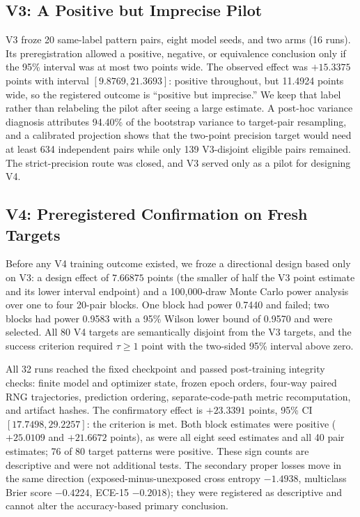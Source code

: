 \subsection{V3: A Positive but Imprecise Pilot}

V3 froze 20 same-label pattern pairs, eight model seeds, and two arms (16
runs).  Its preregistration allowed a positive, negative, or equivalence
conclusion only if the 95\% interval was at most two points wide.  The
observed effect was $+15.3375$ points with interval $[9.8769,21.3693]$:
positive throughout, but 11.4924 points wide, so the registered outcome is
``positive but imprecise.''  We keep that label rather than relabeling the
pilot after seeing a large estimate.  A post-hoc variance diagnosis
attributes 94.40\% of the bootstrap variance to target-pair resampling, and
a calibrated projection shows that the two-point precision target would
need at least 634 independent pairs while only 139 V3-disjoint eligible
pairs remained.  The strict-precision route was closed, and V3 served only
as a pilot for designing V4.

\subsection{V4: Preregistered Confirmation on Fresh Targets}

Before any V4 training outcome existed, we froze a directional design based
only on V3: a design effect of $7.66875$ points (the smaller of half the V3
point estimate and its lower interval endpoint) and a 100,000-draw Monte
Carlo power analysis over one to four 20-pair blocks.  One block had power
0.7440 and failed; two blocks had power 0.9583 with a 95\% Wilson lower
bound of 0.9570 and were selected.  All 80 V4 targets are semantically
disjoint from the V3 targets, and the success criterion required
$\tau\geq1$ point with the two-sided 95\% interval above zero.

All 32 runs reached the fixed checkpoint and passed post-training integrity
checks: finite model and optimizer state, frozen epoch orders, four-way
paired RNG trajectories, prediction ordering, separate-code-path metric
recomputation, and artifact hashes.  The confirmatory effect is $+23.3391$
points, 95\% CI $[17.7498,29.2257]$: the criterion is met.  Both block
estimates were positive ($+25.0109$ and $+21.6672$ points), as were all
eight seed estimates and all 40 pair estimates; 76 of 80 target patterns
were positive.  These sign counts are descriptive and were not additional
tests.  The secondary proper losses move in the same direction
(exposed-minus-unexposed cross entropy $-1.4938$, multiclass Brier score
$-0.4224$, ECE-15 $-0.2018$); they were registered as descriptive and
cannot alter the accuracy-based primary conclusion.

